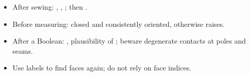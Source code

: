 \begin{itemize}
\item After sewing: , , ; then
.
\item Before measuring: closed and consistently oriented, otherwise  raises.
\item After a Boolean: , plausibility of ; beware degenerate
contacts at poles and seams.
\item Use labels to find faces again; do not rely on face indices.
\end{itemize}
